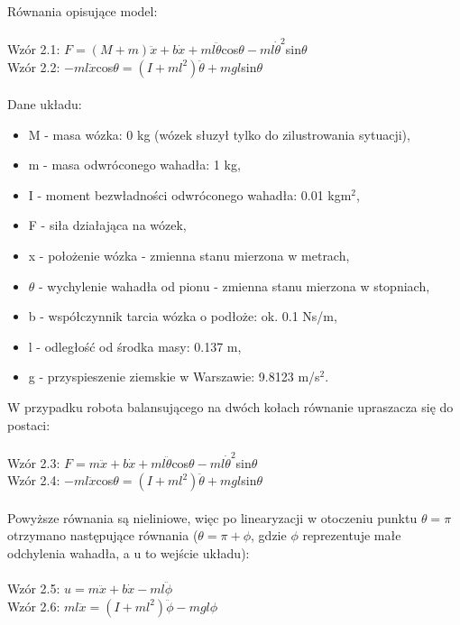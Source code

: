 \documentclass[a4paper,12pt,twoside,openany]{report}
\begin{document}
\noindent Równania opisujące model:\\
\\
Wzór 2.1: $F=(M+m)\ddot{x}+b\dot{x}+ml\ddot{\theta}$cos$\theta-ml\dot{\theta}^2$sin$\theta$ \\
Wzór 2.2: $-ml\ddot{x}$cos$\theta=(I+ml^2)\ddot{\theta}+mgl$sin$\theta$ \\
\\
Dane układu:
\begin{itemize}
\item M - masa wózka: 0 kg (wózek słuzył tylko do zilustrowania sytuacji),
\item m - masa odwróconego wahadła: 1 kg,
\item I - moment bezwładności odwróconego wahadła: 0.01 kgm$^2$,
\item F - siła działająca na wózek,
\item x - położenie wózka - zmienna stanu mierzona w metrach,
\item $\theta$ - wychylenie wahadła od pionu - zmienna stanu mierzona w stopniach,
\item b - współczynnik tarcia wózka o podłoże: ok. 0.1 Ns/m, 
\item l - odległość od środka masy: 0.137 m,
\item g - przyspieszenie ziemskie w Warszawie: 9.8123 m/s$^2$.
\end{itemize} 

\noindent W przypadku robota balansującego na dwóch kołach równanie upraszacza się do postaci:\\
\\
Wzór 2.3: $F=m\ddot{x}+b\dot{x}+ml\ddot{\theta}$cos$\theta-ml\dot{\theta}^2$sin$\theta$ \\
Wzór 2.4: $-ml\ddot{x}$cos$\theta=(I+ml^2)\ddot{\theta}+mgl$sin$\theta$ \\
\\
Powyższe równania są nieliniowe, więc po linearyzacji w otoczeniu punktu $\theta=\pi$ otrzymano następujące równania ($\theta=\pi+\phi$, gdzie $\phi$ reprezentuje małe odchylenia wahadła, a u to wejście układu):\\
\\
Wzór 2.5: $u=m\ddot{x}+b\dot{x}-ml\ddot{\phi}$ \\
Wzór 2.6: $ml\ddot{x}=(I+ml^2)\ddot{\phi}-mgl\phi$ \\
\end{document}
